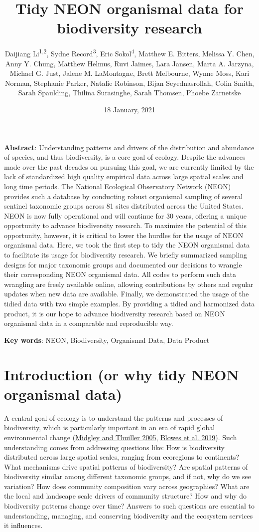 \documentclass[
  12pt,
]{article}
\title{Tidy NEON organismal data for biodiversity research}
\author{Daijiang Li\textsuperscript{1,2}, Sydne Record\textsuperscript{3}, Eric Sokol\textsuperscript{4}, Matthew E. Bitters, Melissa Y. Chen, Anny Y. Chung, Matthew Helmus, Ruvi Jaimes, Lara Jansen, Marta A. Jarzyna, Michael G. Just, Jalene M. LaMontagne, Brett Melbourne, Wynne Moss, Kari Norman, Stephanie Parker, Natalie Robinson, Bijan Seyednasrollah, Colin Smith, Sarah Spaulding, Thilina Surasinghe, Sarah Thomsen, Phoebe Zarnetske}
\date{18 January, 2021}
\makeatletter
\newcommand\iraggedright{%
  \let\\\@centercr\@rightskip\@flushglue \rightskip\@rightskip
  \leftskip\z@skip}
\makeatother
\begin{document}
\maketitle

\iraggedright

{
\setcounter{tocdepth}{2}
\tableofcontents
}
\textbf{Abstract}: Understanding patterns and drivers of the distribution and abundance of species, and thus biodiversity, is a core goal of ecology. Despite the advances made over the past decades on pursuing this goal, we are currently limited by the lack of standardized high quality empirical data across large spatial scales and long time periods. The National Ecological Observatory Network (NEON) provides such a database by conducting robust organismal sampling of several sentinel taxonomic groups across 81 sites distributed across the United States. NEON is now fully operational and will continue for 30 years, offering a unique opportunity to advance biodiversity research. To maximize the potential of this opportunity, however, it is critical to lower the hurdles for the usage of NEON organismal data. Here, we took the first step to tidy the NEON organismal data to facilitate its usage for biodiversity research. We briefly summarized sampling designs for major taxonomic groups and documented our decisions to wrangle their corresponding NEON organismal data. All codes to perform such data wrangling are freely available online, allowing contributions by others and regular updates when new data are available. Finally, we demonstrated the usage of the tidied data with two simple examples. By providing a tidied and harmonized data product, it is our hope to advance biodiversity research based on NEON organismal data in a comparable and reproducible way.

\textbf{Key words}: NEON, Biodiversity, Organismal Data, Data Product

\hypertarget{introduction-or-why-tidy-neon-organismal-data}{%
\section{Introduction (or why tidy NEON organismal data)}\label{introduction-or-why-tidy-neon-organismal-data}}

A central goal of ecology is to understand the patterns and processes of biodiversity, which is particularly important in an era of rapid global environmental change (\protect\hyperlink{ref-midgley2005global}{Midgley and Thuiller 2005}, \protect\hyperlink{ref-blowes2019geography}{Blowes et al. 2019}). Such understanding comes from addressing questions like: How is biodiversity distributed across large spatial scales, ranging from ecoregions to continents? What mechanisms drive spatial patterns of biodiversity? Are spatial patterns of biodiversity similar among different taxonomic groups, and if not, why do we see variation? How does community composition vary across geographies? What are the local and landscape scale drivers of community structure? How and why do biodiversity patterns change over time? Answers to such questions are essential to understanding, managing, and conserving biodiversity and the ecosystem services it influences.
\end{document}
